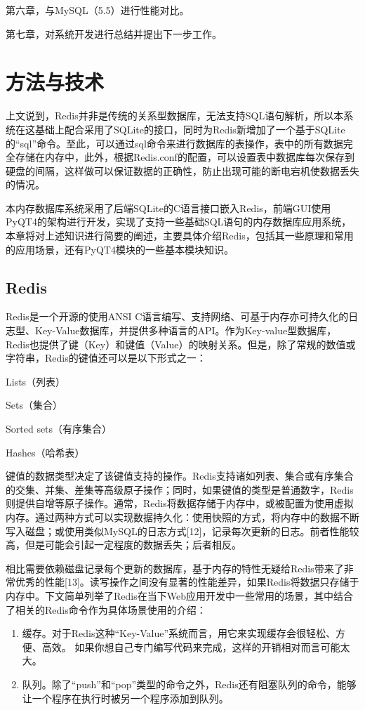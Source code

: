 \documentclass{zjutthesis}
\begin{document}
第六章，与MySQL（5.5）进行性能对比。

第七章，对系统开发进行总结并提出下一步工作。


\chapter{方法与技术}
上文说到，Redis并非是传统的关系型数据库，无法支持SQL语句解析，所以本系统在这基础上配合采用了SQLite的接口，同时为Redis新增加了一个基于SQLite的“sql”命令。至此，可以通过sql命令来进行数据库的表操作，表中的所有数据完全存储在内存中，此外，根据Redis.conf的配置，可以设置表中数据库每次保存到硬盘的间隔，这样做可以保证数据的正确性，防止出现可能的断电宕机使数据丢失的情况。

本内存数据库系统采用了后端SQLite的C语言接口嵌入Redis，前端GUI使用PyQT4的架构进行开发，实现了支持一些基础SQL语句的内存数据库应用系统，本章将对上述知识进行简要的阐述，主要具体介绍Redis，包括其一些原理和常用的应用场景，还有PyQT4模块的一些基本模块知识。

\section{Redis}
Redis是一个开源的使用ANSI C语言编写、支持网络、可基于内存亦可持久化的日志型、Key-Value数据库，并提供多种语言的API。作为Key-value型数据库，Redis也提供了键（Key）和键值（Value）的映射关系。但是，除了常规的数值或字符串，Redis的键值还可以是以下形式之一：

Lists（列表）

Sets（集合）

Sorted sets（有序集合）

Hashes（哈希表）

键值的数据类型决定了该键值支持的操作。Redis支持诸如列表、集合或有序集合的交集、并集、差集等高级原子操作；同时，如果键值的类型是普通数字，Redis则提供自增等原子操作。通常，Redis将数据存储于内存中，或被配置为使用虚拟内存。通过两种方式可以实现数据持久化：使用快照的方式，将内存中的数据不断写入磁盘；或使用类似MySQL的日志方式[12]，记录每次更新的日志。前者性能较高，但是可能会引起一定程度的数据丢失；后者相反。

相比需要依赖磁盘记录每个更新的数据库，基于内存的特性无疑给Redis带来了非常优秀的性能[13]。读写操作之间没有显著的性能差异，如果Redis将数据只存储于内存中。下文简单列举了Redis在当下Web应用开发中一些常用的场景，其中结合了相关的Redis命令作为具体场景使用的介绍：

\begin{enumerate}[label=（\arabic*）]

\item{缓存。对于Redis这种“Key-Value”系统而言，用它来实现缓存会很轻松、方便、高效。
如果你想自己专门编写代码来完成，这样的开销相对而言可能太大。}

\item{队列。除了“push”和“pop”类型的命令之外，Redis还有阻塞队列的命令，能够让一个程序在执行时被另一个程序添加到队列。}

\end{enumerate}
\end{document}
